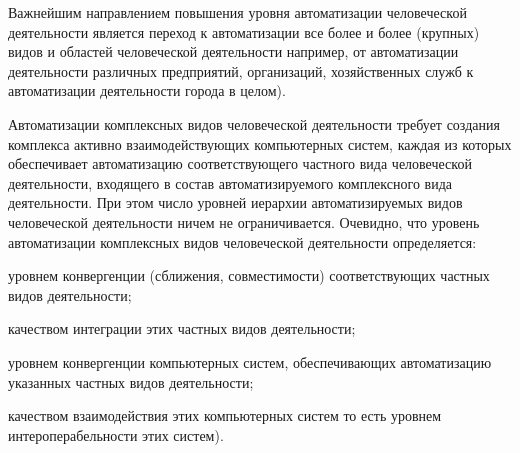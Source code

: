 Важнейшим направлением повышения уровня автоматизации человеческой деятельности является переход к автоматизации все более и более  (крупных) видов и областей человеческой деятельности например, от автоматизации деятельности различных предприятий, организаций, хозяйственных служб к автоматизации деятельности города в целом).

Автоматизации комплексных видов человеческой деятельности требует создания комплекса активно взаимодействующих компьютерных систем, каждая из которых обеспечивает автоматизацию соответствующего частного вида человеческой деятельности, входящего в состав автоматизируемого комплексного вида деятельности. При этом число уровней иерархии автоматизируемых видов человеческой деятельности ничем не ограничивается. Очевидно, что уровень автоматизации комплексных видов человеческой деятельности определяется:

\begin{textitemize}
	\item
	уровнем конвергенции (сближения, совместимости) соответствующих частных видов деятельности;
	\item
	качеством интеграции этих частных видов деятельности;
	\item
	уровнем конвергенции компьютерных систем, обеспечивающих автоматизацию указанных частных видов деятельности;
	\item
	качеством взаимодействия этих компьютерных систем то есть уровнем интероперабельности этих систем).
\end{textitemize}

